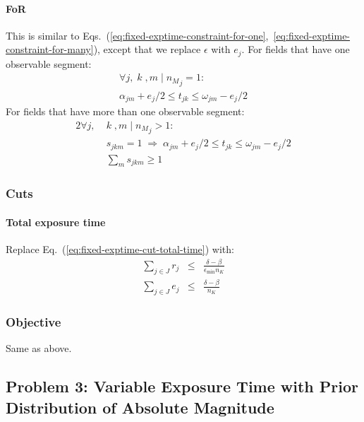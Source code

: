 \documentclass[twocolumn,times]{aastex631}
\begin{document}
\paragraph{\ac{FoR}}
This is similar to Eqs.~(\ref{eq:fixed-exptime-constraint-for-one},~\ref{eq:fixed-exptime-constraint-for-many}), except that we replace $\epsilon$ with $e_j$. For fields that have one observable segment:
%
\begin{multline}
    \label{eq:variable-exptime-constraint-for-one}
    \forall j ,\; k \;, m \mid {n_M}_j = 1 : \\ \alpha_{jm} + e_j / 2 \leq t_{jk} \leq \omega_{jm} - e_j / 2
\end{multline}
%
For fields that have more than one observable segment:
%
\begin{alignat}{2}
    \label{eq:variable-exptime-constraint-for-many}
    \forall j ,\; &k \;, m \mid {n_M}_j > 1 : \nonumber \\
    &s_{jkm} = 1 \;\Rightarrow\; \alpha_{jm} + e_j / 2 \leq t_{jk} \leq \omega_{jm} - e_j / 2 \\
    &\sum_m s_{jkm} \geq 1
\end{alignat}

\subsubsection{Cuts}

\paragraph{Total exposure time}
Replace Eq.~(\ref{eq:fixed-exptime-cut-total-time}) with:
%
\begin{eqnarray}
    \label{eq:ariable-exptime-cut-total-time}
    \sum_{j \in J} r_j &\leq& \frac{\delta - \beta}{\epsilon_\mathrm{min} n_K} \\
    \sum_{j \in J} e_j &\leq& \frac{\delta - \beta}{n_K}
\end{eqnarray}

\subsubsection{Objective}

Same as above.

\subsection{Problem 3: Variable Exposure Time with Prior Distribution of Absolute Magnitude}
\label{sec:absmag-distn}
\end{document}
